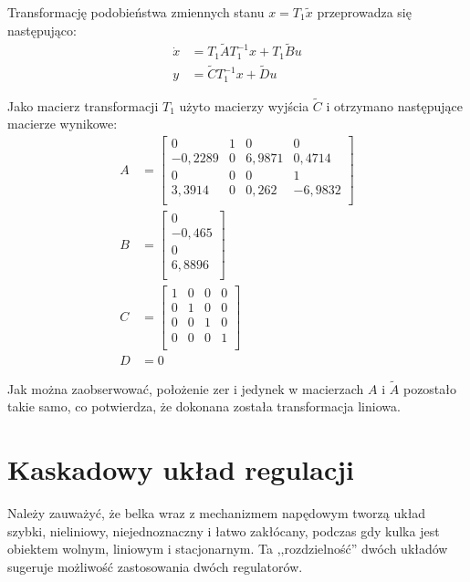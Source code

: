 Transformację podobieństwa zmiennych stanu $x = T_1 \tilde{x}$ przeprowadza się następująco:
\begin{align}
    \dot{x} &= T_1 \widetilde{A} T_1^{-1} x + T_1 \widetilde{B} u \nonumber \\
    y &= \widetilde{C} T_1^{-1} x + \widetilde{D} u \label{eq:transformacja_x}
\end{align}

Jako macierz transformacji $T_1$ użyto macierzy wyjścia $\widetilde{C}$ i otrzymano następujące macierze wynikowe:
\begin{align}
    A &= \begin{bmatrix}
         0 & 1 & 0 & 0 \\
         -0,2289 & 0 & 6,9871 & 0,4714 \\
         0 & 0 & 0 & 1 \\
         3,3914 & 0 & 0,262 & -6,9832 \\
    \end{bmatrix} \nonumber \\
    B &= \begin{bmatrix}
         0 \\
         -0,465 \\
         0 \\
         6,8896 \\
    \end{bmatrix} \nonumber \\
    C &= \begin{bmatrix}
    1 & 0 & 0 & 0 \\
    0 & 1 & 0 & 0 \\
    0 & 0 & 1 & 0 \\
    0 & 0 & 0 & 1 \\
    \end{bmatrix} \nonumber \\
    D &= 0 \label{eq:macierze_stanu2}
\end{align}

Jak można zaobserwować, położenie zer i jedynek w macierzach $A$ i $\widetilde{A}$ pozostało takie samo, co potwierdza, że dokonana została transformacja liniowa.

\section{Kaskadowy układ regulacji}
\label{sec:ch5_kaskadowy_uklad_regulacji}

Należy zauważyć, że belka wraz z mechanizmem napędowym tworzą układ szybki, nieliniowy, niejednoznaczny i łatwo zakłócany, podczas gdy kulka jest obiektem wolnym, liniowym i stacjonarnym. Ta ,,rozdzielność'' dwóch układów sugeruje możliwość zastosowania dwóch regulatorów.

